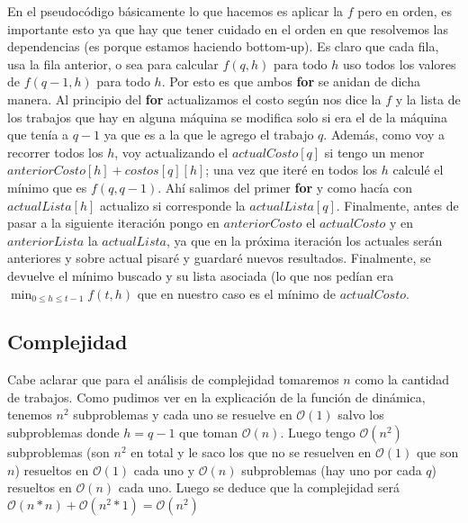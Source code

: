 \documentclass[A4paper,oneside,fleqn,11pt]{article}
\theoremstyle{definition}
\begin{document}
En el pseudocódigo básicamente lo que hacemos es aplicar la $f$ pero en orden, es importante esto ya que hay que tener cuidado en el orden en que resolvemos las dependencias (es porque estamos haciendo bottom-up). Es claro que cada fila, usa la fila anterior, o sea para calcular $f(q,h)$ para todo $h$ uso todos los valores de $f(q-1,h)$ para todo $h$. Por esto es que ambos \textbf{for} se anidan de dicha manera. Al principio del \textbf{for} actualizamos el costo según nos dice la $f$ y la lista de los trabajos que hay en alguna máquina se modifica solo si era el de la máquina que tenía a $q-1$ ya que es a la que le agrego el trabajo $q$. Además, como voy a recorrer todos los $h$, voy actualizando el $actualCosto[q]$ si tengo un menor $anteriorCosto[h]+costos[q][h]$; una vez que iteré en todos los $h$ calculé el mínimo que es $f(q,q-1)$. Ahí salimos del primer \textbf{for} y como hacía con $actualLista[h]$ actualizo si corresponde la $actualLista[q]$. Finalmente, antes de pasar a la siguiente iteración pongo en $anteriorCosto$ el $actualCosto$ y en $ anteriorLista$ la $actualLista$, ya que en la próxima iteración los actuales serán anteriores y sobre actual pisaré y guardaré nuevos resultados. Finalmente, se devuelve el mínimo buscado y su lista asociada (lo que nos pedían era $\displaystyle \min_{0 \leq h \leq t-1} {f(t,h)}  $ que en nuestro caso es el mínimo de $actualCosto$.



\subsection{Complejidad}

Cabe aclarar que para el análisis de complejidad tomaremos $n$ como la cantidad de trabajos. Como pudimos ver en la explicación de la función de dinámica, tenemos $n^2$ subproblemas y cada uno se resuelve en  $\mathcal{O}(1)$ salvo los subproblemas donde $ h=q-1$ que toman $\mathcal{O}(n)$. Luego tengo $\mathcal{O}(n^2)$ subproblemas (son $n^2$ en total y le saco los que no se resuelven en $\mathcal{O}(1)$ que son $n$)  resueltos en $\mathcal{O}(1)$ cada uno y $\mathcal{O}(n)$ subproblemas (hay uno por cada $q$) resueltos en $\mathcal{O}(n)$ cada uno. Luego se deduce que la complejidad será $\mathcal{O}(n*n)+\mathcal{O}(n^2 *1)=\mathcal{O}(n^2)$
\end{document}
